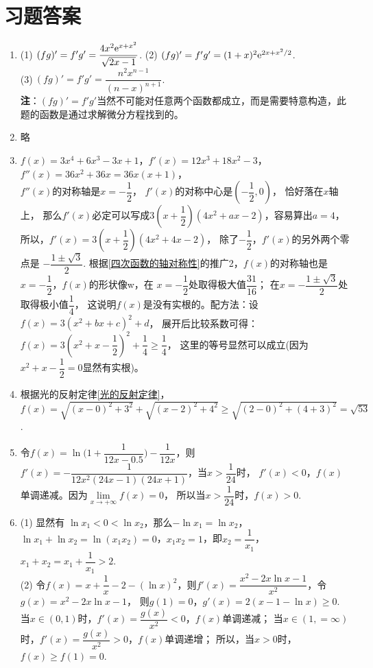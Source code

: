 \section{习题答案}
\begin{enumerate}[label={\textbf{\thechapter.\arabic*}},leftmargin=
    \inteval{\myenumleftmargin}pt]
\item (1)$\ (fg)'=f'g'=\dfrac{4x^2\e^{x+x^2}}{\sqrt{2x-1}} $. \quad
(2)$\ (fg)'=f'g'=(1+x)^2\mathrm{e}^{2x+x^2/2} $. \\
(3)$\ (fg)'=f'g'=\dfrac{n^2x^{n-1}}{(n-x)^{n+1}} $. \\
\textbf{注}：$ (fg)'=f'g' $当然不可能对任意两个函数都成立，而是需要特意构造，此题的函数是通过求解微分方程找到的。

\item 略

\item $ f(x)=3x^4+6x^3-3x+1 $，$ f'(x)=12x^3+18x^2-3 $，
$ f''(x)=36x^2+36x=36x(x+1) $，\\
$ f''(x) $的对称轴是$ x=-\dfrac{1}{2} $，
$ f'(x) $的对称中心是$ \left(-\dfrac{1}{2},0\right) $，
恰好落在$ x $轴上，
那么$ f'(x) $必定可以写成$ 3\left(x+
\dfrac{1}{2}\right)(4x^2+ax-2) $，容易算出$ a=4 $，
所以，$ f'(x)=3\left(x+\dfrac{1}{2}\right)(4x^2+4x-2) $，
除了$ -\dfrac{1}{2} $，$ f'(x) $的另外两个零点是
$ -\dfrac{1\pm \sqrt{3}}{2} $. 
根据\ref{四次函数的轴对称性}的推广2，$ f(x) $的对称轴也是
$ x=-\dfrac{1}{2} $，$ f(x) $的形状像w，在
$ x=-\dfrac{1}{2} $处取得极大值$ \dfrac{31}{16} $；
在$ x=-\dfrac{1\pm \sqrt{3}}{2} $处取得极小值$ \dfrac{1}{4} $，
这说明$ f(x) $是没有实根的。配方法：设$ f(x)=3(x^2+bx+c)^2+d $，
展开后比较系数可得：$ f(x)=3\left(x^2+x-
\dfrac{1}{2}\right)^2+\dfrac{1}{4}\geq \dfrac{1}{4} $，
这里的等号显然可以成立(因为$ x^2+x-\dfrac{1}{2}=0 $显然有实根)。

\item 根据光的反射定律\ref{光的反射定律}，\\
$ f(x)=\sqrt{(x-0)^2+3^2}+\sqrt{(x-2)^2+4^2}\geq 
\sqrt{(2-0)^2+(4+3)^2} =\sqrt{53} $.

\item 令$f(x)=\ln\Big(1+\dfrac{1}{12x-0.5}\Big)-\dfrac{1}{12x}$，则
$f'(x)=-\dfrac{1}{12x^2(24x-1)(24x+1)}$，当$x>\dfrac{1}{24}$时，
$f'(x)<0$，$f(x)$单调递减。因为$\lim\limits_{x\to+\infty}f(x)=0$，
所以当$x>\dfrac{1}{24}$时，$f(x)>0$.

\item (1) 显然有 $ \ln x_1<0<\ln x_2 $，那么$ -\ln x_1=\ln x_2 $，
$ \ln x_1+\ln x_2=\ln(x_1x_2)=0 $，$ x_1x_2=1 $，即$ x_2=\dfrac{1}{x_1} $，
$ x_1+x_2=x_1+\dfrac{1}{x_1}>2 $. \\
(2) 令$f(x)=x+\dfrac{1}{x}-2-(\ln x)^2$，则$ f'(x)=
\dfrac{x^2-2x\ln x-1}{x^2} $，令$g(x)=x^2-2x\ln x-1$，
则$g(1)=0$，$g'(x)=2(x-1-\ln x)\geq 0$.
当$x\in(0,1)$时，$f'(x)=\dfrac{g(x)}{x^2}<0$，$f(x)$单调递减；
当$x\in(1,=\infty)$时，$f'(x)=\dfrac{g(x)}{x^2}>0$，$f(x)$单调递增；
所以，当$x>0$时，$f(x)\geq f(1)=0$.


\end{enumerate}
